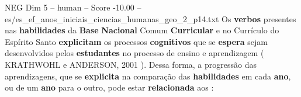 \begin{textsample}{NEG Dim 5 – human – Score -10.00 – es/es\_ef\_anos\_iniciais\_ciencias\_humanas\_geo\_2\_p14.txt}  \label{ex:f5_neg_005}
Os \textbf{verbos} presentes nas \textbf{habilidades} da \textbf{Base} \textbf{Nacional} Comum \textbf{Curricular} e no Currículo do Espírito Santo \textbf{explicitam} os processos \textbf{cognitivos} que se \textbf{espera} sejam desenvolvidos pelos \textbf{estudantes} no processo de ensino e aprendizagem ( KRATHWOHL e ANDERSON, 2001 ).
Dessa forma, a progressão das aprendizagens, que se \textbf{explicita} na comparação das \textbf{habilidades} em cada \textbf{ano}, ou de um \textbf{ano} para o outro, pode estar \textbf{relacionada} aos :

\end{textsample}
